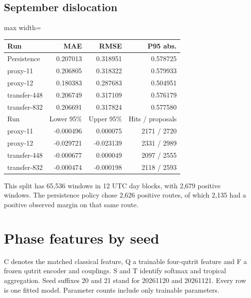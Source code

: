 \documentclass[11pt,oneside,openany]{book}
\begin{document}
\section*{September dislocation}
\begin{center}\footnotesize\sffamily\setlength{\tabcolsep}{3.5pt}\renewcommand{\arraystretch}{1.2}
\begin{adjustbox}{max width=\linewidth}\begin{tabular}{@{}lrrr@{}}\toprule
Run & MAE & RMSE & P95 abs. \\ \midrule
Persistence & 0.207013 & 0.318951 & 0.578725 \\
proxy-11 & 0.206805 & 0.318322 & 0.579933 \\
proxy-12 & 0.180383 & 0.287683 & 0.504951 \\
transfer-448 & 0.206749 & 0.317109 & 0.576179 \\
transfer-832 & 0.206691 & 0.317824 & 0.577580 \\
Run & Lower 95\% & Upper 95\% & Hits / proposals \\
proxy-11 & -0.000496 & 0.000075 & 2171 / 2720 \\
proxy-12 & -0.029721 & -0.023139 & 2331 / 2989 \\
transfer-448 & -0.000677 & 0.000049 & 2097 / 2555 \\
transfer-832 & -0.000474 & -0.000198 & 2118 / 2593 \\
\bottomrule\end{tabular}\end{adjustbox}\end{center}
This split has 65,536 windows in 12 UTC day blocks, with 2,679 positive windows. The persistence policy chose 2,626 positive routes, of which 2,135 had a positive observed margin on that same route.

\chapter{Phase features by seed}
C denotes the matched classical feature, Q a trainable four-qutrit feature and F a frozen qutrit encoder and couplings. S and T identify softmax and tropical aggregation. Seed suffixes 20 and 21 stand for 20261120 and 20261121. Every row is one fitted model. Parameter counts include only trainable parameters.
\end{document}

